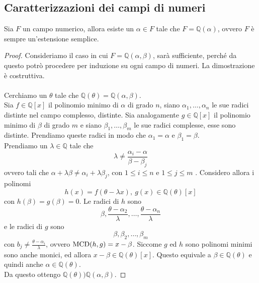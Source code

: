 \subsection{Caratterizzazioni dei campi di numeri}
\begin{teorema}
	Sia $F$ un campo numerico, allora esiste un $\alpha\in F$ tale che $F=\mathbb{Q}(\alpha)$, ovvero $F$ è sempre un'estensione semplice.
\end{teorema}
\begin{proof}
	Consideriamo il caso in cui $F=\mathbb{Q}(\alpha,\beta)$, sarà sufficiente, perché da questo potrò procedere per induzione su ogni campo di numeri. La dimostrazione è costruttiva. \\ \\ 
	Cerchiamo un $\theta$ tale che $\mathbb{Q}(\theta)=\mathbb{Q}(\alpha,\beta)$. \\ Sia $f\in\mathbb{Q}[x]$ il polinomio minimo di $\alpha$ di grado $n$, siano $\alpha_1,\dots,\alpha_n$ le sue radici distinte nel campo complesso, distinte. Sia analogamente $g\in\mathbb{Q}[x]$ il polinomio minimo di $\beta$ di grado $m$ e siano $\beta_1,\dots,\beta_m$ le sue radici complesse, esse sono distinte. Prendiamo queste radici in modo che $\alpha_1=\alpha$ e $\beta_1=\beta$.\\ Prendiamo un $\lambda\in\mathbb{Q}$ tale che 
	\begin{equation*}
	\lambda\neq\frac{\alpha_i-\alpha}{\beta-\beta_j}
	\end{equation*}
	ovvero tali che $\alpha+\lambda\beta\neq\alpha_i+\lambda\beta_j$, con $1\leq i\leq n$ e $1\leq j\leq m$ . Considero allora i polinomi
	\begin{equation*}
	h(x)=f\left(\theta-\lambda x\right), \ g(x)\in\mathbb{Q}(\theta)[x]
	\end{equation*}
	con $h(\beta)=g(\beta)=0$. Le radici di $h$ sono 
	\begin{equation*}
	\beta, \frac{\theta-\alpha_2}{\lambda},\dots,\frac{\theta-\alpha_n}{\lambda}
	\end{equation*}
	e le radici di $g$ sono
	\begin{equation*}
	\beta, \beta_2, \dots, \beta_m
	\end{equation*}
	con $b_j\neq\frac{\theta-\alpha_i}{\lambda}$, ovvero $\operatorname{\mathrm{MCD}}(h,g)=x-\beta$. Siccome $g$ ed $h$ sono polinomi minimi sono anche monici, ed allora $x-\beta\in\mathbb{Q}(\theta)[x]$. Questo equivale a $\beta\in\mathbb{Q}(\theta)$ e quindi anche $\alpha\in\mathbb{Q}(\theta)$.\\ Da questo ottengo $\mathbb{Q}(\theta))\mathbb{Q}(\alpha,\beta)$.
\end{proof}
